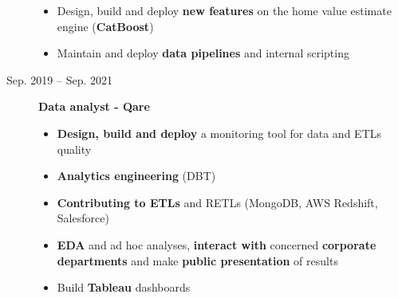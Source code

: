 \documentclass[a4paper,10pt]{article}
\begin{document}
\begin{adjustbox}{valign=t}
\begin{minipage}{0.6\textwidth}
\begin{description}
\begin{itemize}[topsep=0pt]
                    \item Design, build and deploy \textbf{new features} on the home value estimate engine (\textbf{CatBoost})
                    \item Maintain and deploy \textbf{data pipelines} and internal scripting
                \end{itemize}
                \normalsize
            \item[\normalfont \textcolor{ColorOne}{Sep. 2019 -- Sep. 2021}]
                \textbf{Data analyst - Qare}\\
                \small
                \begin{itemize}[topsep=0pt]
                    \item \textbf{Design, build and deploy} a monitoring tool for data and ETLs quality
                    \item \textbf{Analytics engineering} (DBT)
                    \item \textbf{Contributing to ETLs} and RETLs (MongoDB, AWS Redshift, Salesforce)
                    \item \textbf{EDA} and ad hoc analyses, \textbf{interact with} concerned \textbf{corporate departments} and make \textbf{public presentation} of results
                    \item Build \textbf{Tableau} dashboards
                \end{itemize}
                \normalsize
        \end{description}
        \vspace{-1cm}

\end{minipage}
\end{adjustbox}
\end{document}
